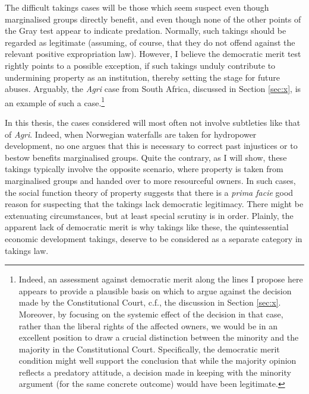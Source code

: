 The difficult takings cases will be those which seem suspect even though marginalised groups directly benefit, and even though none of the other points of the Gray test appear to indicate predation. Normally, such takings should be regarded as legitimate (assuming, of course, that they do not offend against the relevant positive expropriation law). However, I believe the democratic merit test rightly points to a possible exception, if such takings unduly contribute to undermining property as an institution, thereby setting the stage for future abuses. Arguably, the {\it Agri} case from South Africa, discussed in Section \ref{sec:x}, is an example of such a case.\footnote{Indeed, an assessment against democratic merit along the lines I propose here appears to provide a plausible basis on which to argue against the decision made by the Constitutional Court, c.f., the discussion in Section \ref{sec:x}. Moreover, by focusing on the systemic effect of the decision in that case, rather than the liberal rights of the affected owners, we would be in an excellent position to draw a crucial distinction between the minority and the majority in the Constitutional Court. Specifically, the democratic merit condition might well support the conclusion that while the majority opinion reflects a predatory attitude, a decision made in keeping with the minority argument (for the same concrete outcome) would have been legitimate.}

In this thesis, the cases considered will most often not involve subtleties like that of {\it Agri}. Indeed, when Norwegian waterfalls are taken for hydropower development, no one argues that this is necessary to correct past injustices or to bestow benefits marginalised groups. Quite the contrary, as I will show, these takings typically involve the opposite scenario, where property is taken from marginalised groups and handed over to more resourceful owners. In such cases, the social function theory of property suggests that there is a {\it prima facie} good reason for suspecting that the takings lack democratic legitimacy. There might be extenuating circumstances, but at least special scrutiny is in order. Plainly, the apparent lack of democratic merit is why takings like these, the quintessential economic development takings, deserve to be considered as a separate category in takings law.

